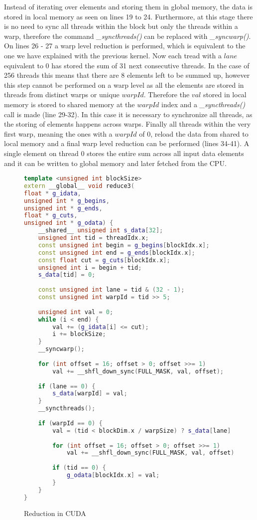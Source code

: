 \documentclass[]{article}
\begin{document}
Instead of iterating over elements and storing them in global memory, the data is stored in local memory as seen on lines 19 to 24. Furthermore, at this stage there is no need to sync all threads within the block but only the threads within a warp, therefore the command \textit{\_syncthreads()} can be replaced with \textit{\_syncwarp()}.
On lines 26 - 27 a warp level reduction is performed, which is equivalent to the one we have explained with the previous kernel. Now each tread with a $lane$ equivalent to 0 has stored the sum of 31 next consecutive threads. In the case of 256 threads this means that there are 8 elements left to be summed up, however this step cannot be performed on a warp level as all the elements are stored in threads from distinct warps or unique $warpId$. Therefore the $val$ stored in local memory is stored to shared memory at the $warpId$ index and a \textit{\_syncthreads()} call is made (line 29-32). In this case it is necessary to synchronize all threads, as the storing of elements happens across warps.
Finally all threads within the very first warp, meaning the ones with a $warpId$ of 0, reload the data from shared to local memory and a final warp level reduction can be performed (lines 34-41). A single element on thread 0 stores the entire sum across all input data elements and it can be written to global memory and later fetched from the CPU.

\begin{figure}[H]
	\begin{lstlisting}[language=c++, caption=Kernel Optimized GPU Count Left,
		label = ctlocudawrp]
template <unsigned int blockSize>
extern __global__ void reduce3(
float * g_idata,
unsigned int * g_begins,
unsigned int * g_ends,
float * g_cuts,
unsigned int * g_odata) {
	__shared__ unsigned int s_data[32];
	unsigned int tid = threadIdx.x;
	const unsigned int begin = g_begins[blockIdx.x];
	const unsigned int end = g_ends[blockIdx.x];
	const float cut = g_cuts[blockIdx.x];
	unsigned int i = begin + tid;
	s_data[tid] = 0;
	
	const unsigned int lane = tid & (32 - 1);
	const unsigned int warpId = tid >> 5;
	
	unsigned int val = 0;
	while (i < end) {
		val += (g_idata[i] <= cut);
		i += blockSize;
	}
	__syncwarp();
	
	for (int offset = 16; offset > 0; offset >>= 1)
		val += __shfl_down_sync(FULL_MASK, val, offset);
	
	if (lane == 0) {
		s_data[warpId] = val;
	}
	__syncthreads();
	
	if (warpId == 0) {
		val = (tid < blockDim.x / warpSize) ? s_data[lane] : 0;
		
		for (int offset = 16; offset > 0; offset >>= 1)
			val += __shfl_down_sync(FULL_MASK, val, offset);
		
		if (tid == 0) {
			g_odata[blockIdx.x] = val;
		}
	}
}
	\end{lstlisting}
	\caption{Reduction in CUDA}
	\label{cuda:reduction3}
\end{figure}
\end{document}

